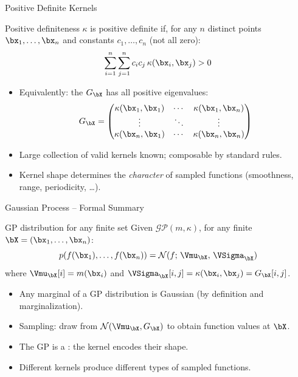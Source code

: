 \begin{frame}{Positive Definite Kernels}{}
  \begin{block}{Positive definiteness}
    $\kappa$ is positive definite if, for any $n$ distinct points
    $\bx_1,\ldots,\bx_n$ and constants $c_1,\ldots,c_n$ (not all zero):
    \[
      \sum_{i=1}^n\sum_{j=1}^n c_i c_j\,\kappa(\bx_i,\bx_j)>0
    \]
  \end{block}

  \medskip
  \begin{itemize}
    \item Equivalently: the  $G_{\bX}$ has all positive eigenvalues:
      \[
        G_{\bX}=\begin{pmatrix}
          \kappa(\bx_1,\bx_1) & \cdots & \kappa(\bx_1,\bx_n)\\
          \vdots & \ddots & \vdots\\
          \kappa(\bx_n,\bx_1) & \cdots & \kappa(\bx_n,\bx_n)
        \end{pmatrix}
      \]
    \item Large collection of valid kernels known; composable by standard rules.
    \item Kernel shape determines the \emph{character} of sampled functions
          (smoothness, range, periodicity, \ldots).
  \end{itemize}
\end{frame}

\begin{frame}{Gaussian Process -- Formal Summary}{}
  \begin{block}{GP distribution for any finite set}
    Given $\mathcal{GP}(m,\kappa)$, for any finite $\bX=(\bx_1,\ldots,\bx_n)$:
    \[
      p(f(\bx_1),\ldots,f(\bx_n))=\mathcal{N}(f;\,\Vmu_{\bX},\,\VSigma_{\bX})
    \]
    where $\Vmu_{\bX}[i]=m(\bx_i)$ and $\VSigma_{\bX}[i,j]=\kappa(\bx_i,\bx_j)=G_{\bX}[i,j]$.
  \end{block}

  \medskip
  \begin{itemize}
    \item Any marginal of a GP distribution is Gaussian (by definition and marginalization).
    \item Sampling: draw from $\mathcal{N}(\Vmu_{\bX},G_{\bX})$ to obtain function values at $\bX$.
    \item The GP is a : the kernel encodes their shape.
    \item Different kernels produce different types of sampled functions.
  \end{itemize}
\end{frame}

